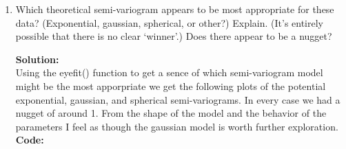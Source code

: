 \documentclass[12pt]{article}
\makeatletter
\theoremstyle{homework}
\newenvironment{exercise}[1]
{\def\@currentlabel{#1}\exercisecore}
{\endexercisecore}
\newcommand{\localhead}[1]{\par\smallskip\noindent\textbf{#1}\nobreak\\}%
\newcommand\solution{\localhead{Solution:}}
\makeatother
\begin{document}
\begin{exercise}{4}
\begin{enumerate}
  
  
  \item Which theoretical semi-variogram appears to be most appropriate for these
  data? (Exponential, gaussian, spherical, or other?)
  Explain.  (It's entirely possible that there is no clear `winner'.)
  Does there appear to be a nugget?\\
  \solution Using the eyefit() function to get a sence of which semi-variogram model might be the most apporpriate we 
  get the following plots of the potential exponential, gaussian, and spherical semi-variograms. In every case we had a nugget of 
  around 1. From the shape of the model and the behavior of the parameters I feel as though the gaussian model is worth further exploration.\\  
  \textbf{Code:}
  \begin{center}
  
  \end{center}
  \vspace{.15in}

  




\end{enumerate}
\end{exercise}
\end{document}
